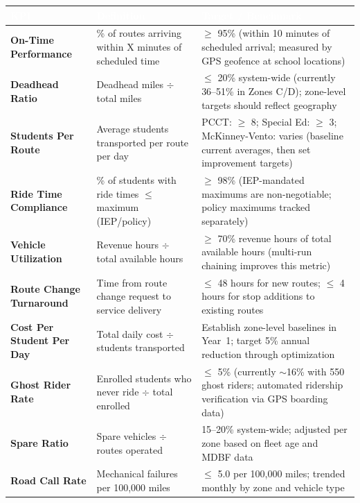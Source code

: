 \begin{longtable}{|p{4cm}|p{5.5cm}|p{4cm}|}
\hline
\rowcolor{tableHeader}
\textcolor{white}{\textbf{KPI}} &
\textcolor{white}{\textbf{Definition}} &
\textcolor{white}{\textbf{Target / Benchmark}} \\
\hline
\endfirsthead

\textbf{On-Time Performance} & \% of routes arriving within X minutes of scheduled time & $\geq$ 95\% (within 10 minutes of scheduled arrival; measured by GPS geofence at school locations) \\ \hline

\textbf{Deadhead Ratio} & Deadhead miles $\div$ total miles & $\leq$ 20\% system-wide (currently 36--51\% in Zones C/D); zone-level targets should reflect geography \\ \hline

\textbf{Students Per Route} & Average students transported per route per day & PCCT: $\geq$ 8; Special Ed: $\geq$ 3; McKinney-Vento: varies (baseline current averages, then set improvement targets) \\ \hline

\textbf{Ride Time Compliance} & \% of students with ride times $\leq$ maximum (IEP/policy) & $\geq$ 98\% (IEP-mandated maximums are non-negotiable; policy maximums tracked separately) \\ \hline

\textbf{Vehicle Utilization} & Revenue hours $\div$ total available hours & $\geq$ 70\% revenue hours of total available hours (multi-run chaining improves this metric) \\ \hline

\textbf{Route Change Turnaround} & Time from route change request to service delivery & $\leq$ 48 hours for new routes; $\leq$ 4 hours for stop additions to existing routes \\ \hline

\textbf{Cost Per Student Per Day} & Total daily cost $\div$ students transported & Establish zone-level baselines in Year~1; target 5\% annual reduction through optimization \\ \hline

\textbf{Ghost Rider Rate} & Enrolled students who never ride $\div$ total enrolled & $\leq$ 5\% (currently $\sim$16\% with 550 ghost riders; automated ridership verification via GPS boarding data) \\ \hline

\textbf{Spare Ratio} & Spare vehicles $\div$ routes operated & 15--20\% system-wide; adjusted per zone based on fleet age and MDBF data \\ \hline

\textbf{Road Call Rate} & Mechanical failures per 100,000 miles & $\leq$ 5.0 per 100,000 miles; trended monthly by zone and vehicle type \\ \hline
\end{longtable}

